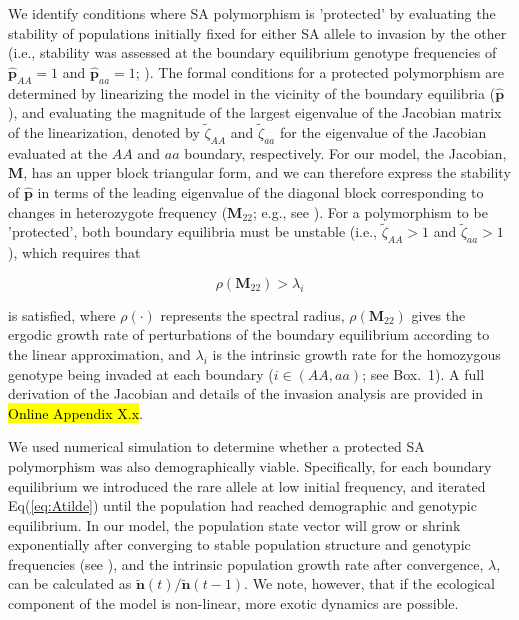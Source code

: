 \documentclass[11pt]{article}
\def\mbf#1{\mathbf{#1}}
\begin{document}
We identify conditions where SA polymorphism is 'protected' by evaluating the stability of populations initially fixed for either SA allele to invasion by the other (i.e., stability was assessed at the boundary equilibrium genotype frequencies of $\hat{\mbf{p}}_{AA} = 1$ and $\hat{\mbf{p}}_{aa} = 1$; \citealt{Levene1953, Prout1968, deVriesCaswell2019b}). The formal conditions for a protected polymorphism are determined by linearizing the model in the vicinity of the boundary equilibria ($\hat{\mbf{p}}$), and evaluating the magnitude of the largest eigenvalue of the Jacobian matrix of the linearization, denoted by $\tilde{\zeta}_{AA}$ and $\tilde{\zeta}_{aa}$ for the eigenvalue of the Jacobian evaluated at the $AA$ and $aa$ boundary, respectively. For our model, the Jacobian, $\mbf{M}$, has an upper block triangular form, and we can therefore express the stability of $\hat{\mbf{p}}$ in terms of the leading eigenvalue of the diagonal block corresponding to changes in heterozygote frequency ($\mbf{M}_{22}$; e.g., see \citealt{OttoDay2007,deVriesCaswell2019b}). For a polymorphism to be 'protected', both boundary equilibria must be unstable (i.e., $\tilde{\zeta}_{AA} > 1$ and $\tilde{\zeta}_{aa} > 1$), which requires that
\begin{linenomath*}
\begin{equation}\label{eq:PolyCond}
	\rho(\mbf{M}_{22}) > \lambda_{i}
\end{equation}
\end{linenomath*}

\noindent is satisfied, where $\rho(\cdot)$ represents the spectral radius,  $\rho(\mbf{M}_{22})$ gives the ergodic growth rate of perturbations of the boundary equilibrium according to the linear approximation, and $\lambda_i$ is the intrinsic growth rate for the homozygous genotype being invaded at each boundary ($i \in (AA,aa)$; see Box.~1). A full derivation of the Jacobian and details of the invasion analysis are provided in \hl{Online Appendix X.x}.

We used numerical simulation to determine whether a protected SA polymorphism was also demographically viable. Specifically, for each boundary equilibrium we introduced the rare allele at low initial frequency, and iterated Eq(\ref{eq:Atilde}) until the population had reached demographic and genotypic equilibrium. In our model, the population state vector will grow or shrink exponentially after converging to stable population structure and genotypic frequencies (see \citealt{Caswell2001}), and the intrinsic population growth rate after convergence, $\lambda$, can be calculated as $\tilde{\mbf{n}}(t)/\tilde{\mbf{n}}(t-1)$. We note, however, that if the ecological component of the model is non-linear, more exotic dynamics are possible.
\end{document}
